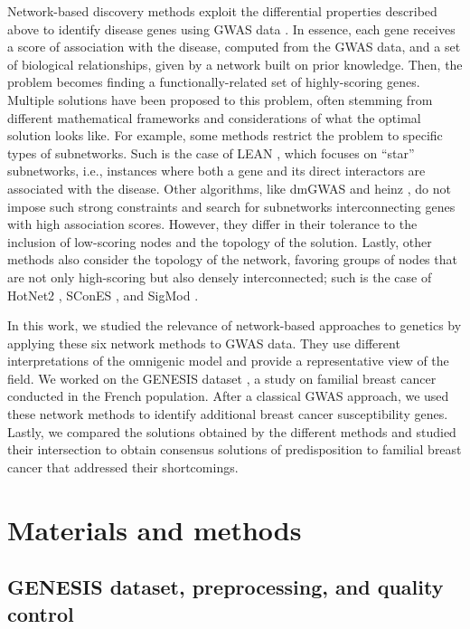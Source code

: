 \documentclass[10pt,letterpaper]{article}
\begin{document}
Network-based discovery methods exploit the differential properties described above to identify disease genes using GWAS data \cite{azencott_network-guided_2016,huang_systematic_2018}. In essence, each gene receives a score of association with the disease, computed from the GWAS data, and a set of biological relationships, given by a network built on prior knowledge. Then, the problem becomes finding a functionally-related set of highly-scoring genes. Multiple solutions have been proposed to this problem, often stemming from different mathematical frameworks and considerations of what the optimal solution looks like. For example, some methods restrict the problem to specific types of subnetworks. Such is the case of LEAN \cite{gwinner_network-based_2016}, which focuses on ``star'' subnetworks, i.e., instances where both a gene and its direct interactors are associated with the disease. Other algorithms, like dmGWAS \cite{jia_dmgwas:_2011} and heinz \cite{dittrich_identifying_2008}, do not impose such strong constraints and search for subnetworks interconnecting genes with high association scores. However, they differ in their tolerance to the inclusion of low-scoring nodes and the topology of the solution. Lastly, other methods also consider the topology of the network, favoring groups of nodes that are not only high-scoring but also densely interconnected; such is the case of HotNet2 \cite{leiserson_pan-cancer_2015}, SConES \cite{azencott_efficient_2013}, and SigMod \cite{liu_sigmod:_2017}.

In this work, we studied the relevance of network-based approaches to genetics by applying these six network methods to GWAS data. They use different interpretations of the omnigenic model and provide a representative view of the field. We worked on the GENESIS dataset \cite{sinilnikova_genesis:_2016}, a study on familial breast cancer conducted in the French population. After a classical GWAS approach, we used these network methods to identify additional breast cancer susceptibility genes. Lastly, we compared the solutions obtained by the different methods and studied their intersection to obtain consensus solutions of predisposition to familial breast cancer that addressed their shortcomings. 

\section{Materials and methods}

\subsection{GENESIS dataset, preprocessing, and quality control}
\label{methods:data}
\end{document}
